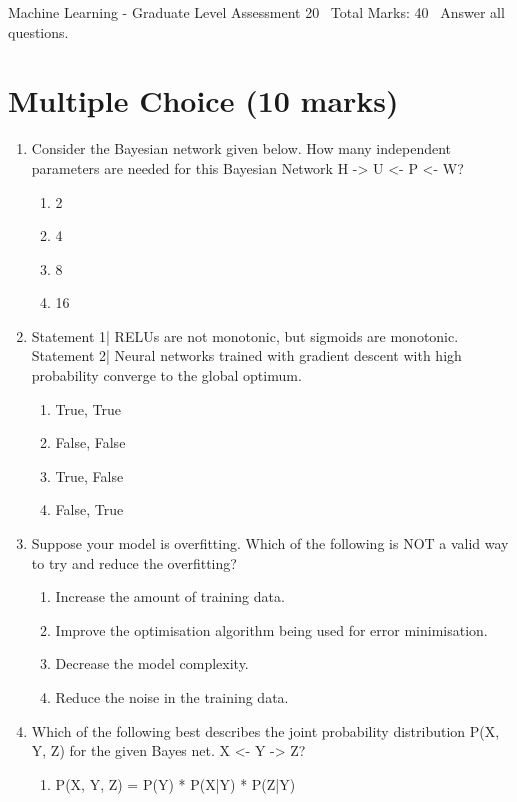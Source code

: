\documentclass[12pt]{article}
\begin{document}
\begin{center}
Machine Learning - Graduate Level Assessment 20 \
Total Marks: 40 \
Answer all questions.
\end{center}

\section*{Multiple Choice (10 marks)}
\begin{enumerate}[label=\arabic*.]
\item Consider the Bayesian network given below. How many independent parameters are needed for this Bayesian Network H -\textgreater{} U \textless{}- P \textless{}- W?
\begin{enumerate}[label=(\alph*)]
    \item 2
    \item 4
    \item 8
    \item 16
\end{enumerate}
\item Statement 1| RELUs are not monotonic, but sigmoids are monotonic. Statement 2| Neural networks trained with gradient descent with high probability converge to the global optimum.
\begin{enumerate}[label=(\alph*)]
    \item True, True
    \item False, False
    \item True, False
    \item False, True
\end{enumerate}
\item Suppose your model is overfitting. Which of the following is NOT a valid way to try and reduce the overfitting?
\begin{enumerate}[label=(\alph*)]
    \item Increase the amount of training data.
    \item Improve the optimisation algorithm being used for error minimisation.
    \item Decrease the model complexity.
    \item Reduce the noise in the training data.
\end{enumerate}
\item Which of the following best describes the joint probability distribution P(X, Y, Z) for the given Bayes net. X \textless{}- Y -\textgreater{} Z?
\begin{enumerate}[label=(\alph*)]
    \item P(X, Y, Z) = P(Y) * P(X|Y) * P(Z|Y)

\end{enumerate}
\end{enumerate}
\end{document}
